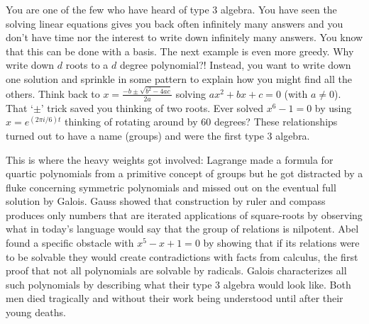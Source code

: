 You are one of the few who have heard of type 3 algebra.
You have seen the solving linear equations gives you back often infinitely many 
answers and you don't have time nor the interest to write down infinitely many answers.
You know that this can be done with a basis.  The next example is even more 
greedy.  Why write down $d$ roots to a $d$ degree polynomial?!  Instead, you 
want to write down one solution and sprinkle in some pattern to explain how you 
might find all the others.  Think back to 
$x=\frac{-b\pm \sqrt{b^2-4ac}}{2a}$ solving $ax^2+bx+c=0$ (with $a\neq 0$).
That `$\pm$' trick saved you thinking of two roots.  Ever solved $x^6-1=0$ by 
using $x=e^{(2\pi i/6) t}$ thinking of rotating around by 60 degrees?  
These relationships turned out to have a name (groups) and were the first type 3 
algebra.

This is where the heavy weights got
involved: Lagrange made a formula for quartic polynomials from a primitive
concept of groups but he got distracted by a fluke concerning symmetric polynomials 
and missed out on the eventual full solution by Galois.
Gauss showed that construction by ruler and compass produces only numbers 
that are iterated applications of square-roots by observing what in today's 
language would say that the group of relations is nilpotent. 
Abel found a specific obstacle with $x^5-x+1=0$ by showing that if its relations 
were to be solvable they would create contradictions with facts from calculus,
the first proof that not all polynomials are solvable by radicals.  
Galois characterizes all such polynomials by describing what their type 3
algebra would look like.  Both men died tragically and without their work being 
understood until after their young deaths.

